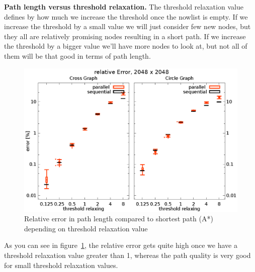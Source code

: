\documentclass[letterpaper]{article}
\newcommand{\mypar}[1]{{\bf #1.}}
\begin{document}
\mypar{Path length versus threshold relaxation}
The threshold relaxation value defines by how much we increase the threshold once the nowlist is empty. If we increase the threshold by a small value we will just consider few new nodes, but they all are relatively promising nodes resulting in a short path. If we increase the threshold by a bigger value we'll have more nodes to look at, but not all of them will be that good in terms of path length.
\begin{figure}[h]\centering
  \includegraphics[scale=0.558]{error_threshold.eps}
  \caption{Relative error in path length compared to shortest path (A*) depending on threshold relaxation value\label{fig:error_thresh}}
\end{figure}
As you can see in figure~\ref{fig:error_thresh}, the relative error gets quite high once we have a threshold relaxation value greater than 1, whereas the path quality is very good for small threshold relaxation values.
\end{document}
